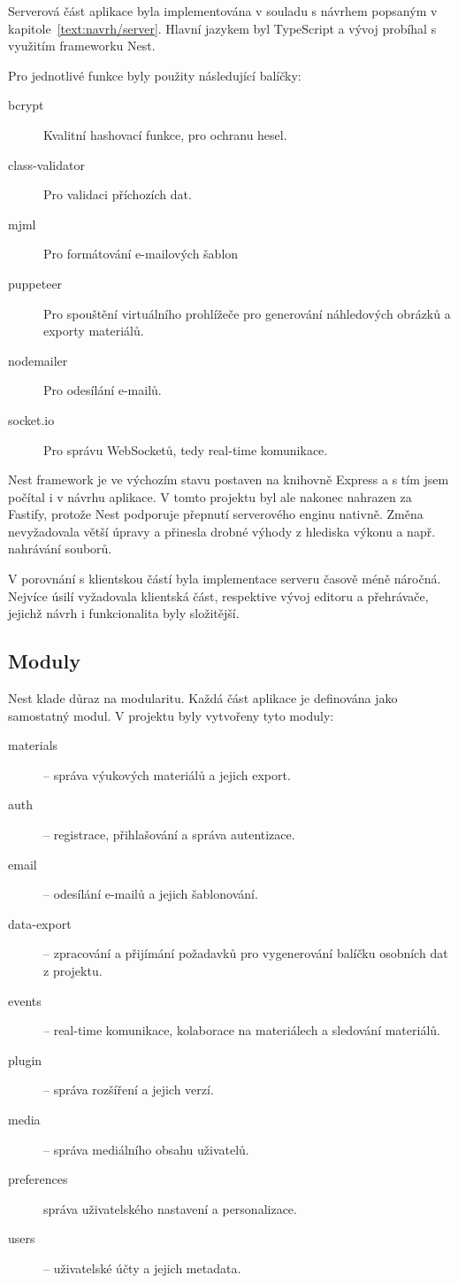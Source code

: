 Serverová část aplikace byla implementována v souladu s návrhem popsaným v kapitole~\ref{text:navrh/server}. 
Hlavní jazykem byl TypeScript a vývoj probíhal s využitím frameworku Nest. 

Pro jednotlivé funkce byly použity následující balíčky:

\begin{description}
    \item[bcrypt] Kvalitní hashovací funkce, pro ochranu hesel.
    \item[class-validator] Pro validaci příchozích dat.
    \item[mjml] Pro formátování e-mailových šablon
    \item[puppeteer] Pro spouštění virtuálního prohlížeče pro generování náhledových obrázků a exporty materiálů.
    \item[nodemailer] Pro odesílání e-mailů.
    \item[socket.io] Pro správu WebSocketů, tedy real-time komunikace.
\end{description}

Nest framework je ve výchozím stavu postaven na knihovně Express a s tím jsem počítal i v návrhu aplikace.
V tomto projektu byl ale nakonec nahrazen za Fastify, protože Nest podporuje přepnutí serverového enginu nativně. 
Změna nevyžadovala větší úpravy a přinesla drobné výhody z hlediska výkonu a např. nahrávání souborů.

V porovnání s klientskou částí byla implementace serveru časově méně náročná.
Nejvíce úsilí vyžadovala klientská část, respektive vývoj editoru a přehrávače, jejichž návrh i funkcionalita byly složitější.

\subsection{Moduly}

Nest klade důraz na modularitu. Každá část aplikace je definována jako samostatný modul. V projektu byly vytvořeny tyto moduly:

\begin{description}
    \item[materials] -- správa výukových materiálů a jejich export.
    \item[auth] -- registrace, přihlašování a správa autentizace.
    \item[email] -- odesílání e-mailů a jejich šablonování.
    \item[data-export] -- zpracování a přijímání požadavků pro vygenerování balíčku osobních dat z projektu.
    \item[events] -- real-time komunikace, kolaborace na materiálech a sledování materiálů.
    \item[plugin] -- správa rozšíření a jejich verzí.
    \item[media] -- správa mediálního obsahu uživatelů. 
    \item[preferences] správa uživatelského nastavení a personalizace.
    \item[users] -- uživatelské účty a jejich metadata.
\end{description}

